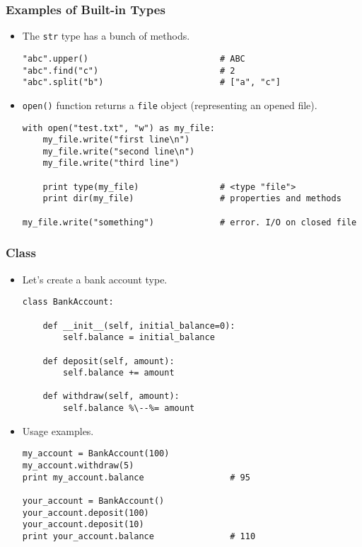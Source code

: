 \documentclass{beamer}
\begin{document}
\begin{frame}[fragile]
\frametitle{Examples of Built-in Types}
\begin{itemize}
\item The \lstinline{str} type has a bunch of methods.
\begin{lstlisting}
"abc".upper()                          # ABC
"abc".find("c")                        # 2
"abc".split("b")                       # ["a", "c"]
\end{lstlisting}
\item \lstinline{open()} function returns a \lstinline{file}
      object (representing an opened file). 
\begin{lstlisting}
with open("test.txt", "w") as my_file:
    my_file.write("first line\n")
    my_file.write("second line\n")
    my_file.write("third line")

    print type(my_file)                # <type "file">
    print dir(my_file)                 # properties and methods 

my_file.write("something")             # error. I/O on closed file
\end{lstlisting}
\end{itemize}
\end{frame}

\begin{frame}[fragile]
\frametitle{Class}
\begin{itemize}
\item Let's create a bank account type.
\begin{lstlisting}[escapechar=\%]
class BankAccount:

    def __init__(self, initial_balance=0):
        self.balance = initial_balance

    def deposit(self, amount):
        self.balance += amount

    def withdraw(self, amount):
        self.balance %\--%= amount
\end{lstlisting}
\item Usage examples.
\begin{lstlisting}
my_account = BankAccount(100)
my_account.withdraw(5)
print my_account.balance                 # 95

your_account = BankAccount()
your_account.deposit(100)
your_account.deposit(10)
print your_account.balance               # 110
\end{lstlisting}
\end{itemize}
\end{frame}
\end{document}
